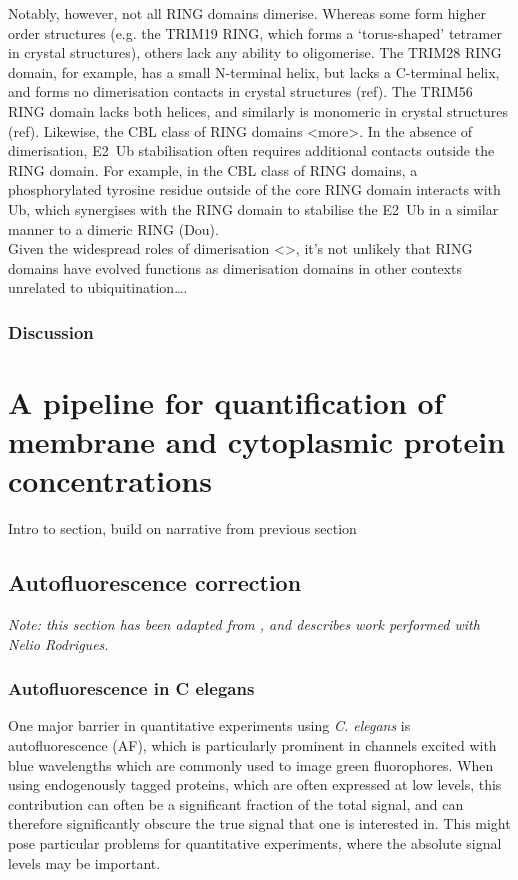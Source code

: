 \documentclass[12pt]{"article"}
\begin{document}
Notably, however, not all RING domains dimerise. Whereas some form higher order structures (e.g. the TRIM19 RING, which forms a ‘torus-shaped’ tetramer in crystal structures), others lack any ability to oligomerise. The TRIM28 RING domain, for example, has a small N-terminal helix, but lacks a C-terminal helix, and forms no dimerisation contacts in crystal structures (ref). The TRIM56 RING domain lacks both helices, and similarly is monomeric in crystal structures (ref). Likewise, the CBL class of RING domains <more>. In the absence of dimerisation, E2~Ub stabilisation often requires additional contacts outside the RING domain. For example, in the CBL class of RING domains, a phosphorylated tyrosine residue outside of the core RING domain interacts with Ub, which synergises with the RING domain to stabilise the E2~Ub in a similar manner to a dimeric RING (Dou).\\

Given the widespread roles of dimerisation <>, it’s not unlikely that RING domains have evolved functions as dimerisation domains in other contexts unrelated to ubiquitination….\\


\subsubsection{Discussion}

\clearpage
\section{A pipeline for quantification of membrane and cytoplasmic protein concentrations}

Intro to section, build on narrative from previous section

\subsection{Autofluorescence correction}

\textit{Note: this section has been adapted from \textcite{Rodrigues2022}, and describes work performed with Nelio Rodrigues.}

\subsubsection{Autofluorescence in C elegans}

One major barrier in quantitative experiments using \textit{C. elegans} is autofluorescence (AF), which is particularly prominent in channels excited with blue wavelengths which are commonly used to image green fluorophores. When using endogenously tagged proteins, which are often expressed at low levels, this contribution can often be a significant fraction of the total signal, and can therefore significantly obscure the true signal that one is interested in. This might pose particular problems for quantitative experiments, where the absolute signal levels may be important.\\
\end{document}
